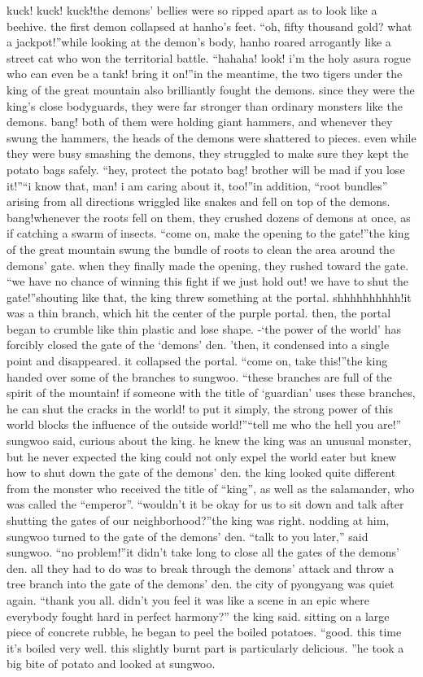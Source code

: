 kuck! kuck! kuck!the demons’ bellies were so ripped apart as to look like a beehive.
the first demon collapsed at hanho’s feet.
“oh, fifty thousand gold? what a jackpot!”while looking at the demon’s body, hanho roared arrogantly like a street cat who won the territorial battle.
“hahaha! look! i’m the holy asura rogue who can even be a tank! bring it on!”in the meantime, the two tigers under the king of the great mountain also brilliantly fought the demons.
 since they were the king’s close bodyguards, they were far stronger than ordinary monsters like the demons.
bang!
both of them were holding giant hammers, and whenever they swung the hammers, the heads of the demons were shattered to pieces.
even while they were busy smashing the demons, they struggled to make sure they kept the potato bags safely.
“hey, protect the potato bag! brother will be mad if you lose it!”“i know that, man! i am caring about it, too!”in addition, “root bundles” arising from all directions wriggled like snakes and fell on top of the demons.
bang!whenever the roots fell on them, they crushed dozens of demons at once, as if catching a swarm of insects.
“come on, make the opening to the gate!”the king of the great mountain swung the bundle of roots to clean the area around the demons’ gate.
 when they finally made the opening, they rushed toward the gate.
“we have no chance of winning this fight if we just hold out! we have to shut the gate!”shouting like that, the king threw something at the portal.
shhhhhhhhhh!it was a thin branch, which hit the center of the purple portal.
 then, the portal began to crumble like thin plastic and lose shape.
-‘the power of the world’ has forcibly closed the gate of the ‘demons’ den.
’then, it condensed into a single point and disappeared.
 it collapsed the portal.
“come on, take this!”the king handed over some of the branches to sungwoo.
“these branches are full of the spirit of the mountain! if someone with the title of ‘guardian’ uses these branches, he can shut the cracks in the world! to put it simply, the strong power of this world blocks the influence of the outside world!”“tell me who the hell you are!” sungwoo said, curious about the king.
he knew the king was an unusual monster, but he never expected the king could not only expel the world eater but knew how to shut down the gate of the demons’ den.
the king looked quite different from the monster who received the title of “king”, as well as the salamander, who was called the “emperor”.
“wouldn’t it be okay for us to sit down and talk after shutting the gates of our neighborhood?”the king was right.
nodding at him, sungwoo turned to the gate of the demons’ den.
“talk to you later,” said sungwoo.
“no problem!”it didn’t take long to close all the gates of the demons’ den.
all they had to do was to break through the demons’ attack and throw a tree branch into the gate of the demons’ den.
the city of pyongyang was quiet again.
“thank you all.
 didn’t you feel it was like a scene in an epic where everybody fought hard in perfect harmony?” the king said.
sitting on a large piece of concrete rubble, he began to peel the boiled potatoes.
“good.
 this time it’s boiled very well.
 this slightly burnt part is particularly delicious.
”he took a big bite of potato and looked at sungwoo.


